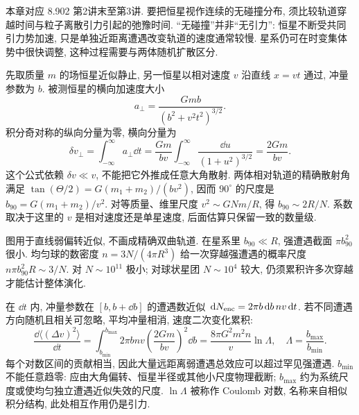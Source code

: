 
本章对应 8.902 第2讲末至第3讲. 要把恒星视作连续的无碰撞分布, 须比较轨道穿越时间与粒子离散引力引起的弛豫时间. “无碰撞”并非“无引力”: 恒星不断受共同引力势加速, 只是单独近距离遭遇改变轨道的速度通常较慢. 星系仍可在时变集体势中很快调整, 这种过程需要与两体随机扩散区分.

先取质量 $m$ 的场恒星近似静止, 另一恒星以相对速度 $v$ 沿直线 $x=vt$ 通过, 冲量参数为 $b$. 被测恒星的横向加速度大小
\[
a_\perp=\frac{Gmb}{(b^2+v^2t^2)^{3/2}}.
\]
积分奇对称的纵向分量为零, 横向分量为
\[
\delta v_\perp=\int_{-\infty}^{\infty}a_\perp\dd t
=\frac{Gm}{bv}\int_{-\infty}^{\infty}\frac{\dd u}{(1+u^2)^{3/2}}
=\frac{2Gm}{bv}.
\]
这个公式依赖 $\delta v\ll v$, 不能把它外推成任意大角散射. 两体相对轨道的精确散射角满足 $\tan(\Theta/2)=G(m_1+m_2)/(bv^2)$, 因而 $90^\circ$ 的尺度是 $b_{90}=G(m_1+m_2)/v^2$. 对等质量、维里尺度 $v^2\sim GN m/R$, 得 $b_{90}\sim2R/N$. 系数取决于这里的 $v$ 是相对速度还是单星速度, 后面估算只保留一致的数量级.

\begin{center}
\end{center}
图用于直线弱偏转近似, 不画成精确双曲轨道. 在星系里 $b_{90}\ll R$, 强遭遇截面 $\pi b_{90}^2$ 很小. 均匀球的数密度 $n=3N/(4\pi R^3)$ 给一次穿越强遭遇的概率尺度 $n\pi b_{90}^2R\sim3/N$. 对 $N\sim10^{11}$ 极小; 对球状星团 $N\sim10^4$ 较大, 仍须累积许多次穿越才能估计整体演化.

在 $\dd t$ 内, 冲量参数在 $[b,b+\dd b]$ 的遭遇数近似 $\,\mathrm d N_{
\rm enc}=2\pi b\,\mathrm d b\,nv\,\mathrm d t$. 若不同遭遇方向随机且相关可忽略, 平均冲量相消, 速度二次变化累积:
\[
\frac{\dd\langle(\Delta v)^2\rangle}{\dd t}
=\int_{b_{\min}}^{b_{\max}}2\pi bnv\left(\frac{2Gm}{bv}\right)^2\dd b
=\frac{8\pi G^2m^2n}{v}\ln\Lambda,
\quad\Lambda=\frac{b_{\max}}{b_{\min}}.
\]
每个对数区间的贡献相当, 因此大量远距离弱遭遇总效应可以超过罕见强遭遇. $b_{\min}$ 不能任意趋零: 应由大角偏转、恒星半径或其他小尺度物理截断; $b_{\max}$ 约为系统尺度或使均匀独立遭遇近似失效的尺度. $\ln\Lambda$ 被称作 Coulomb 对数, 名称来自相似积分结构, 此处相互作用仍是引力.

